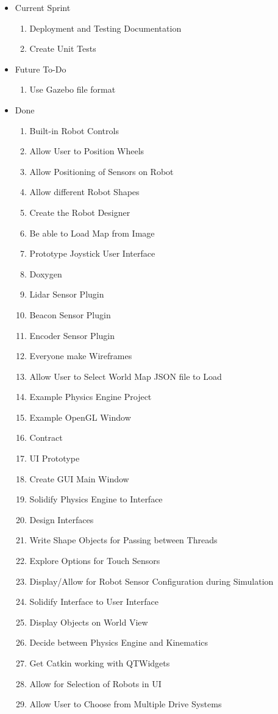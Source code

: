 {\begin{itemize}
\item Current Sprint 
\begin{enumerate}
\item Deployment and Testing Documentation
\item Create Unit Tests
\end{enumerate}
\item Future To-Do 
\begin{enumerate}
\item Use Gazebo file format
\end{enumerate}
\item Done
\begin{enumerate}
\item Built-in Robot Controls 
\item Allow User to Position Wheels
\item Allow Positioning of Sensors on Robot
\item Allow different Robot Shapes
\item Create the Robot Designer
\item Be able to Load Map from Image
\item Prototype Joystick User Interface
\item Doxygen
\item Lidar Sensor Plugin
\item Beacon Sensor Plugin
\item Encoder Sensor Plugin
\item Everyone make Wireframes
\item Allow User to Select World Map JSON file to Load
\item Example Physics Engine Project
\item Example OpenGL Window
\item Contract
\item UI Prototype
\item Create GUI Main Window
\item Solidify Physics Engine to Interface
\item Design Interfaces
\item Write Shape Objects for Passing between Threads
\item Explore Options for Touch Sensors
\item Display/Allow for Robot Sensor Configuration during Simulation
\item Solidify Interface to User Interface
\item Display Objects on World View
\item Decide between Physics Engine and Kinematics
\item Get Catkin working with QTWidgets
\item Allow for Selection of Robots in UI
\item Allow User to Choose from Multiple Drive Systems
\end{enumerate}
\end{itemize}

}
